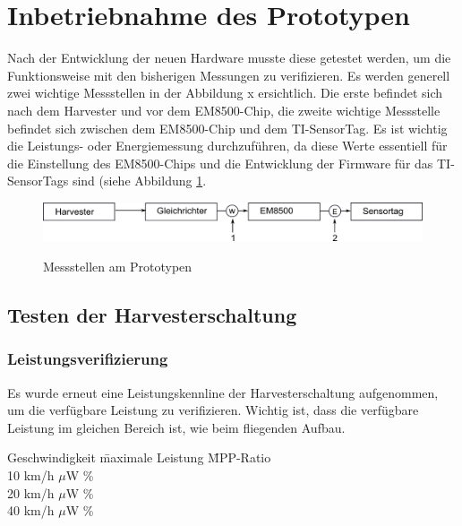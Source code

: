 \section{Inbetriebnahme des Prototypen}
Nach der Entwicklung der neuen Hardware musste diese getestet werden, um die Funktionsweise mit den bisherigen Messungen zu verifizieren. Es werden generell zwei wichtige Messstellen in der Abbildung x ersichtlich. Die erste befindet sich nach dem Harvester und vor dem EM8500-Chip, die zweite wichtige Messstelle befindet sich zwischen dem EM8500-Chip und dem TI-SensorTag. Es ist wichtig die Leistungs- oder Energiemessung durchzuführen, da diese Werte essentiell für die Einstellung des EM8500-Chips und die Entwicklung der Firmware für das TI-SensorTags sind (siehe Abbildung \ref{EnergieMessungStellen}. 

\begin{figure}[ht]
  \includegraphics[width=1.0\textwidth]{3Vorgehen/imag/EnergiemessungStellen.png}\label{EnergieMessungStellen} 
  \caption{Messstellen am Prototypen}
\end{figure}

\subsection{Testen der Harvesterschaltung}

\subsubsection{Leistungsverifizierung}

Es wurde erneut eine Leistungskennline der Harvesterschaltung aufgenommen, um die verfügbare Leistung zu verifizieren. Wichtig ist, dass die verfügbare Leistung im gleichen Bereich ist, wie beim fliegenden Aufbau. 


\begin{tabbing}
    Geschwindigkeit   \quad\= maximale Leistung    \quad\= MPP-Ratio\\[0.8ex]
    10 km/h         $\mu$W   \%\\
	20 km/h         $\mu$W   \%\\
	40 km/h         $\mu$W   \%\\
	
\end{tabbing}%

